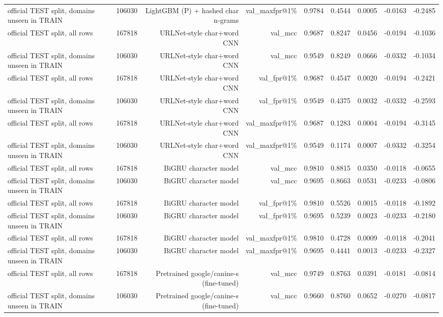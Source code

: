 \begin{table}[t]
\begin{tabular}{llrrrrrrr}
official TEST split, domains unseen in TRAIN & 106030 & LightGBM (P) + hashed char n-grams & val\_maxfpr@1\% & 0.9784 & 0.4544 & 0.0005 & -0.0163 & -0.2485 \\
official TEST split, all rows & 167818 & URLNet-style char+word CNN & val\_mcc & 0.9687 & 0.8247 & 0.0456 & -0.0194 & -0.1036 \\
official TEST split, domains unseen in TRAIN & 106030 & URLNet-style char+word CNN & val\_mcc & 0.9549 & 0.8249 & 0.0666 & -0.0332 & -0.1034 \\
official TEST split, all rows & 167818 & URLNet-style char+word CNN & val\_fpr@1\% & 0.9687 & 0.4547 & 0.0020 & -0.0194 & -0.2421 \\
official TEST split, domains unseen in TRAIN & 106030 & URLNet-style char+word CNN & val\_fpr@1\% & 0.9549 & 0.4375 & 0.0032 & -0.0332 & -0.2593 \\
official TEST split, all rows & 167818 & URLNet-style char+word CNN & val\_maxfpr@1\% & 0.9687 & 0.1283 & 0.0004 & -0.0194 & -0.3145 \\
official TEST split, domains unseen in TRAIN & 106030 & URLNet-style char+word CNN & val\_maxfpr@1\% & 0.9549 & 0.1174 & 0.0007 & -0.0332 & -0.3254 \\
official TEST split, all rows & 167818 & BiGRU character model & val\_mcc & 0.9810 & 0.8815 & 0.0350 & -0.0118 & -0.0655 \\
official TEST split, domains unseen in TRAIN & 106030 & BiGRU character model & val\_mcc & 0.9695 & 0.8663 & 0.0531 & -0.0233 & -0.0806 \\
official TEST split, all rows & 167818 & BiGRU character model & val\_fpr@1\% & 0.9810 & 0.5526 & 0.0015 & -0.0118 & -0.1892 \\
official TEST split, domains unseen in TRAIN & 106030 & BiGRU character model & val\_fpr@1\% & 0.9695 & 0.5239 & 0.0023 & -0.0233 & -0.2180 \\
official TEST split, all rows & 167818 & BiGRU character model & val\_maxfpr@1\% & 0.9810 & 0.4728 & 0.0009 & -0.0118 & -0.2041 \\
official TEST split, domains unseen in TRAIN & 106030 & BiGRU character model & val\_maxfpr@1\% & 0.9695 & 0.4441 & 0.0013 & -0.0233 & -0.2327 \\
official TEST split, all rows & 167818 & Pretrained google/canine-s (fine-tuned) & val\_mcc & 0.9749 & 0.8763 & 0.0391 & -0.0181 & -0.0814 \\
official TEST split, domains unseen in TRAIN & 106030 & Pretrained google/canine-s (fine-tuned) & val\_mcc & 0.9660 & 0.8760 & 0.0652 & -0.0270 & -0.0817 \\

\end{tabular}
\end{table}
